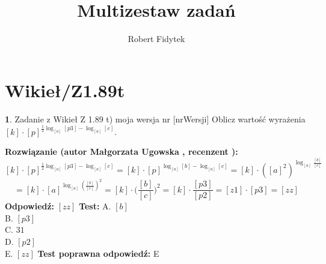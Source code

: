 \documentclass[12pt, a4paper]{article}
\title{Multizestaw zadań}
\author{Robert Fidytek}
\date{}
\theoremstyle{definition} %
\newtheorem{zad}{}
\newcommand{\kategoria}[1]{\section{#1}} %
\newcommand{\zadStart}[1]{\begin{zad}#1\newline} %
\newcommand{\zadStop}{\end{zad}}   %
\newcommand{\rozwStart}[2]{\noindent \textbf{Rozwiązanie (autor #1 , recenzent #2): }\newline} %
\newcommand{\rozwStop}{\newline}                                            %
\newcommand{\odpStart}{\noindent \textbf{Odpowiedź:}\newline}    %
\newcommand{\odpStop}{\newline}                                             %
\newcommand{\testStart}{\noindent \textbf{Test:}\newline} %
\newcommand{\testStop}{\newline} %
\newcommand{\kluczStart}{\noindent \textbf{Test poprawna odpowiedź:}\newline} %
\newcommand{\kluczStop}{\newline} %
\begin{document}
\maketitle


\kategoria{Wikieł/Z1.89t}
\zadStart{Zadanie z Wikieł Z 1.89 t) moja wersja nr [nrWersji]}
Oblicz warto\'sć wyrażenia $[k] \cdot [p]^{\frac{1}{2}\log_{[a]}{[p3]}-\log_{[a]}{[c]}}$.
\zadStop
\rozwStart{Małgorzata Ugowska}{}
$$[k] \cdot [p]^{\frac{1}{2}\log_{[a]}{[p3]}-\log_{[a]}{[c]}} = [k] \cdot [p]^{\log_{[a]}{[b]}-\log_{[a]}{[c]}} = [k] \cdot ([a]^2)^{\log_{[a]}{\frac{[b]}{[c]}}}$$
$$=[k] \cdot [a]^{\log_{[a]}{(\frac{[b]}{[c]})^2}} = [k] \cdot \Big(\frac{[b]}{[c]}\Big)^2 = [k] \cdot \frac{[p3]}{[p2]} = [z1] \cdot [p3] = [zz]$$
\rozwStop
\odpStart
$[zz]$
\odpStop
\testStart
A. $[b]$\\
B. $[p3]$\\
C. $31$\\
D. $[p2]$\\
E. $[zz]$
\testStop
\kluczStart
E
\kluczStop
\end{document}
